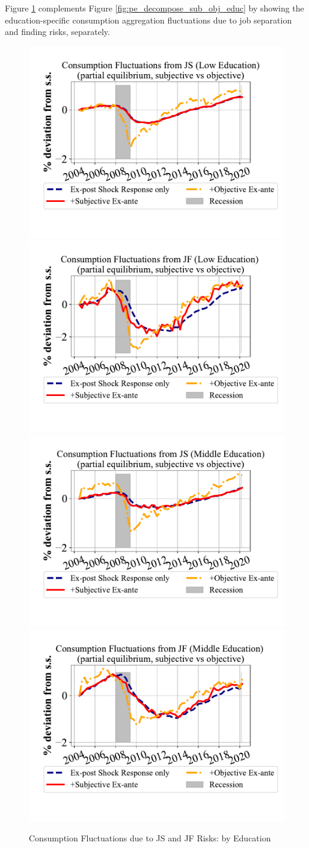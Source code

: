 Figure \ref{appendix_pe_decompose_sub_obj_educ} complements Figure \ref{fig:pe_decompose_sub_obj_educ} by showing the education-specific consumption aggregation fluctuations due to job separation and finding risks, separately. 

  \begin{figure}
        \centering
          \caption{Consumption Fluctuations due to JS and JF Risks: by Education}
\label{appendix_pe_decompose_sub_obj_educ}
\includegraphics[width=0.4\linewidth]{text/Chapter2/Figures/consumption_pe_JS_deviation_machine_as_rational_LowEdu.pdf}
\includegraphics[width=0.4\linewidth]{text/Chapter2/Figures/consumption_pe_JF_deviation_machine_as_rational_LowEdu.pdf}
\\
\includegraphics[width=0.4\linewidth]{text/Chapter2/Figures/consumption_pe_JS_deviation_machine_as_rational_MidEdu.pdf}
\includegraphics[width=0.4\linewidth]{text/Chapter2/Figures/consumption_pe_JF_deviation_machine_as_rational_MidEdu.pdf}
\\


\end{figure}
